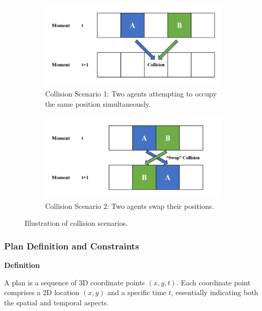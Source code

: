 \begin{figure}[htbp]
    \centering
    \begin{subfigure}[t]{0.6\linewidth}
      \centering
      \includegraphics[width = \linewidth]{figures/Collision1.png}
      \caption{Collision Scenario 1: Two agents attempting to occupy the same position simultaneously.}
      \label{fig:Collision1}
    \end{subfigure}
    \begin{subfigure}[t]{0.6\linewidth}
        \centering
        \includegraphics[width = \linewidth]{figures/Collision2.png}
        \caption{Collision Scenario 2: Two agents swap their positions.}
        \label{fig:Collision2}
      \end{subfigure}
    \caption{Illustration of collision scenarios.}
    \label{fig:Collisions}
\end{figure}

\subsubsection{Plan Definition and Constraints}

\textbf{Definition}

A plan is a sequence of 3D coordinate points $(x,y,t)$. Each coordinate point comprises a 2D location $(x,y)$ and a specific time $t$, essentially indicating both the spatial and temporal aspects.


